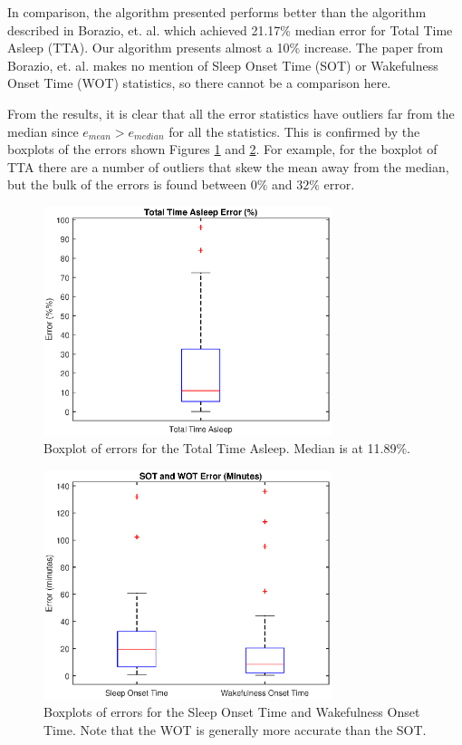             In comparison, the algorithm presented performs better than the algorithm described in Borazio, et. al. \cite{borazio} which achieved 21.17\% median error for Total Time Asleep (TTA). Our algorithm presents almost a 10\% increase. The paper from Borazio, et. al. makes no mention of Sleep Onset Time (SOT) or Wakefulness Onset Time (WOT) statistics, so there cannot be a comparison here.

            From the results, it is clear that all the error statistics have outliers far from the median since $e_{mean} > e_{median}$ for all the statistics. This is confirmed by the boxplots of the errors shown Figures \ref{img_tta_error} and \ref{img_sot_wot_error}. For example, for the boxplot of TTA there are a number of outliers that skew the mean away from the median, but the bulk of the errors is found between $0\%$ and $32\%$ error. 

            \begin{figure}[h]
                \includegraphics[width=0.75\textwidth]{Images/tta_error.eps}
                \centering
                \caption{Boxplot of errors for the Total Time Asleep. Median is at 11.89\%.}
                \label{img_tta_error}
            \end{figure}

            \begin{figure}[h]
                \includegraphics[width=0.75\textwidth]{Images/sot_wot_error.eps}
                \centering
                \caption{Boxplots of errors for the Sleep Onset Time and Wakefulness Onset Time. Note that the WOT is generally more accurate than the SOT.}
                \label{img_sot_wot_error}
            \end{figure}


